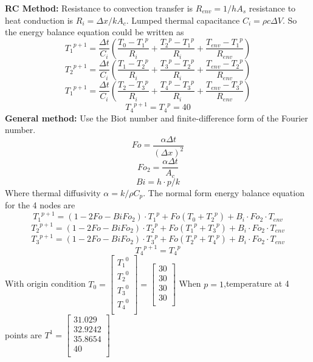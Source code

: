 \begin{solution}
\textbf{RC Method:} 
Resistance to convection  transfer is $R_{env}=1/hA_s$ resistance to heat conduction is
$R_i=\Delta x/kA_c$. Lumped thermal capacitance $C_i=\rho c\Delta V$.
So the energy balance equation could be written as
$$
{T_1}^{p+1}=\frac{\Delta t}{C_i}
\left(
\frac{{T_0}-{T_1}^p}{R_i}+
\frac{{T_2}^p-{T_1}^p}{R_i}+
\frac{T_{env}-{T_1}^p}{R_{env}}
\right)
$$
$$
{T_2}^{p+1}=\frac{\Delta t}{C_i}
\left(
\frac{{T_1}-{T_2}^p}{R_i}+
\frac{{T_3}^p-{T_2}^p}{R_i}+
\frac{T_{env}-{T_2}^p}{R_{env}}
\right)
$$
$$
{T_1}^{p+1}=\frac{\Delta t}{C_i}
\left(
\frac{{T_2}-{T_3}^p}{R_i}+
\frac{{T_4}^p-{T_3}^p}{R_i}+
\frac{T_{env}-{T_3}^p}{R_{env}}
\right)
$$
$${T_4}^{p+1}={T_4}^p=40$$
\textbf{General method:}
Use the Biot number and finite-difference form of the Fourier number.
$$Fo=\frac{\alpha\Delta t}{(\Delta x)^2}$$
$${Fo}_2=\frac{\alpha\Delta t}{A_c}$$
$$Bi=h\cdot p/k $$
Where thermal diffusivity $\alpha=k/\rho C_p$. The normal form energy balance
equation for the 4 nodes are
$$
{T_1}^{p+1}=(1-2Fo-Bi{Fo}_2)\cdot {T_1}^p+
Fo(T_0+{T_2}^p)+B_i\cdot {Fo}_2\cdot T_{env}
$$
$$
{T_2}^{p+1}=(1-2Fo-Bi{Fo}_2)\cdot {T_2}^p+
Fo({T_1}^p+{T_3}^p)+B_i\cdot {Fo}_2\cdot T_{env}
$$
$$
{T_3}^{p+1}=(1-2Fo-Bi{Fo}_2)\cdot {T_3}^p+
Fo({T_2}^p+{T_4}^p)+B_i\cdot {Fo}_2\cdot T_{env}
$$
$${T_4}^{p+1}={T_4}^p$$
With origin condition
$T_0= 
\begin{bmatrix}
{T_1}^0\\
{T_2}^0\\
{T_3}^0\\
{T_4}^0\\
\end{bmatrix}
=
\begin{bmatrix}
30\\
30\\
30\\
30\\
\end{bmatrix}
$
When $p=1$,temperature at 4 points are
$T^1=
\begin{bmatrix}
31.029\\
32.9242\\
35.8654\\
40\\
\end{bmatrix}
$
\end{solution}


